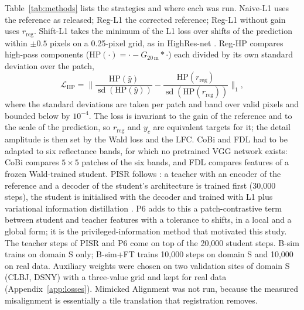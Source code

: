 \documentclass[pdflatex,sn-basic,referee,lineno]{sn-jnl}
\newcommand{\rreg}{r_{\mathrm{reg}}}
\newcommand{\HP}{\mathrm{HP}}
\begin{document}
Table~\ref{tab:methods} lists the strategies and where each was run. Naive-L1 uses the reference as released;
Reg-L1 the corrected reference; Reg-L1 without gain uses $\rreg$. Shift-L1 takes the minimum of the L1 loss over
shifts of the prediction within $\pm0.5$ pixels on a 0.25-pixel grid, as in HighRes-net
\citep{deudon2020highresnet}. Reg-HP compares high-pass components ($\HP(\cdot) = \cdot - G_{20\,\mathrm{m}}*\cdot$)
each divided by its own standard deviation over the patch,
\begin{equation}
\mathcal{L}_{\mathrm{HP}} = \Big\lVert \frac{\HP(\hat y)}{\operatorname{sd}(\HP(\hat y))} -
\frac{\HP(\rreg)}{\operatorname{sd}(\HP(\rreg))} \Big\rVert_1, \label{eq:reghp}
\end{equation}
where the standard deviations are taken per patch and band over valid pixels and bounded below by $10^{-4}$. The
loss is invariant to the gain of the reference and to the scale of the prediction, so $\rreg$ and $y_c$ are
equivalent targets for it; the detail amplitude is then set by the Wald loss and the LFC. CoBi and FDL had to be adapted to six reflectance bands, for which no pretrained
VGG network exists: CoBi compares $5\times5$ patches of the six bands, and FDL compares features of a frozen
Wald-trained student. PISR follows \citet{lee2020pisr}: a teacher with an encoder of the reference and a decoder of
the student's architecture is trained first (30,000 steps), the student is initialised with the decoder and trained
with L1 plus variational information distillation \citep{ahn2019vid}. P6 adds to this a patch-contrastive term
between student and teacher features with a tolerance to shifts, in a local and a global form; it is the
privileged-information method that motivated this study. The teacher steps of PISR and P6 come on top of the
20,000 student steps. B-sim trains on domain S only; B-sim+FT trains 10,000 steps on domain S and 10,000 on real
data. Auxiliary weights were chosen on two validation sites of domain S (CLBJ, DSNY) with a three-value grid and kept for
real data (Appendix~\ref{app:losses}). Mimicked Alignment \citep{elezabi2024mimicked} was not run, because the measured misalignment is essentially
a tile translation that registration removes.
\end{document}
